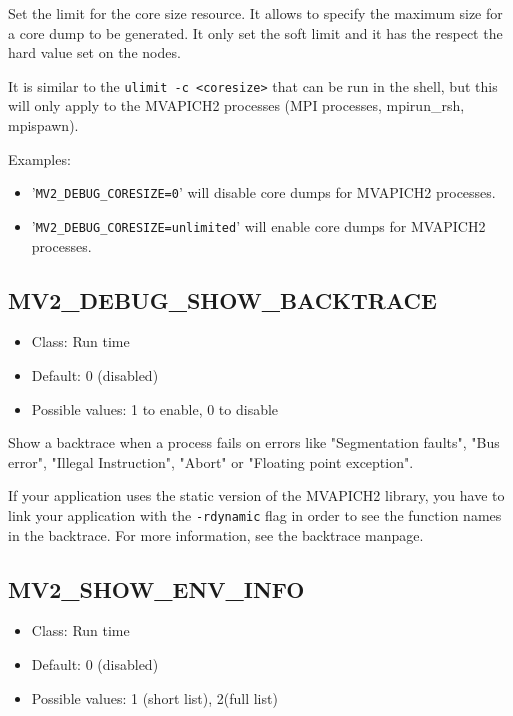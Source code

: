 Set the limit for the core size resource. It allows to specify the maximum size for a core dump to be generated. It only set the soft limit and it has the respect the hard value set on the nodes.

It is similar to the \texttt{ulimit -c <coresize>} that can be run in the shell, but this will only apply to the MVAPICH2 processes (MPI processes, mpirun\_rsh, mpispawn).

Examples:
\begin{itemize}
  \item '\texttt{MV2\_DEBUG\_CORESIZE=0}' will disable core dumps for MVAPICH2 processes.
  \item '\texttt{MV2\_DEBUG\_CORESIZE=unlimited}' will enable core dumps for MVAPICH2 processes.
\end{itemize}



\subsection{MV2\_DEBUG\_SHOW\_BACKTRACE}
\label{def:debug-backtrace}
\begin{itemize}
    \item Class: Run time
    \item Default: 0 (disabled)
    \item Possible values: 1 to enable, 0 to disable
\end{itemize}

Show a backtrace when a process fails on errors like "Segmentation faults", "Bus error", "Illegal Instruction", "Abort" or "Floating point exception".

If your application uses the static version of the MVAPICH2  library, you have to link your application with the \texttt{-rdynamic} flag in order to see the function names in the backtrace. For more information, see the backtrace manpage.

\subsection{MV2\_SHOW\_ENV\_INFO}
\label{def:show-env_info}
\begin{itemize}
    \item Class: Run time
    \item Default: 0 (disabled)
    \item Possible values: 1 (short list), 2(full list)
\end{itemize}

